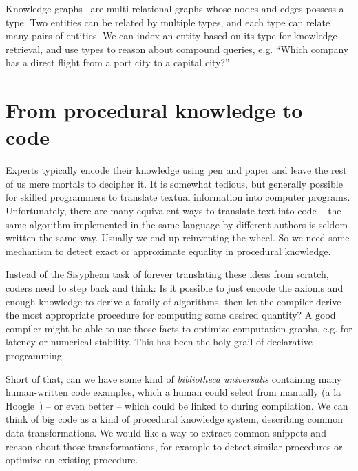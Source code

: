 \documentclass[11pt]{article}
\begin{document}
    Knowledge graphs~\citep{hogan2020knowledge} are multi-relational graphs whose nodes and edges possess a type. Two entities can be related by multiple types, and each type can relate many pairs of entities. We can index an entity based on its type for knowledge retrieval, and use types to reason about compound queries, e.g. ``Which company has a direct flight from a port city to a capital city?''

%

    \pagebreak


    \section{From procedural knowledge to code}\label{sec:applications}

    Experts typically encode their knowledge using pen and paper and leave the rest of us mere mortals to decipher it. It is somewhat tedious, but generally possible for skilled programmers to translate textual information into computer programs. Unfortunately, there are many equivalent ways to translate text into code -- the same algorithm implemented in the same language by different authors is seldom written the same way. Usually we end up reinventing the wheel. So we need some mechanism to detect exact or approximate equality in procedural knowledge.

    Instead of the Sisyphean task of forever translating these ideas from scratch, coders need to step back and think: Is it possible to just encode the axioms and enough knowledge to derive a family of algorithms, then let the compiler derive the most appropriate procedure for computing some desired quantity? A good compiler might be able to use those facts to optimize computation graphs, e.g. for latency or numerical stability. This has been the holy grail of declarative programming.

    Short of that, can we have some kind of \textit{bibliotheca universalis} containing many human-written code examples, which a human could select from manually (a la Hoogle~\citep{james2020digging}) -- or even better -- which could be linked to during compilation. We can think of big code as a kind of procedural knowledge system, describing common data transformations. We would like a way to extract common snippets and reason about those transformations, for example to detect similar procedures or optimize an existing procedure.
\end{document}
